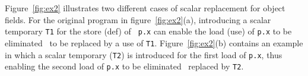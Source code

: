 
Figure~\ref{fig:ex2} illustrates two different cases of scalar
replacement for object fields. 
For the original program in figure~\ref{fig:ex2}(a),
introducing a scalar temporary {\tt T1} for the store (def) of {\tt
p.x} can enable the load (use) of {\tt p.x} to be eliminated \ie\ to
be replaced by a use of {\tt T1}.  Figure~\ref{fig:ex2}(b)
contains an example in which a scalar temporary ({\tt T2}) is
introduced for the first load of {\tt p.x}, thus enabling the second
load of {\tt p.x} to be eliminated \ie\ replaced by {\tt T2}.  %
